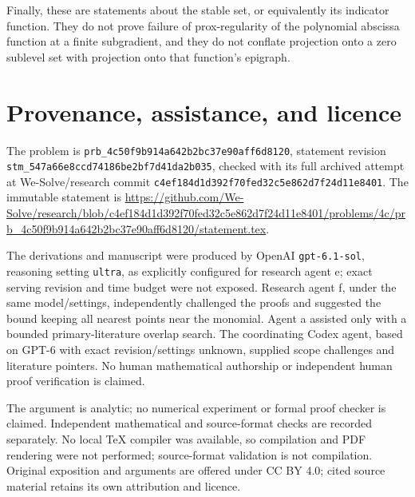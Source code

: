 \documentclass[11pt]{article}
\begin{document}
Finally, these are statements about the stable set, or equivalently its indicator function. They do not prove failure of prox-regularity of the polynomial abscissa function at a finite subgradient, and they do not conflate projection onto a zero sublevel set with projection onto that function's epigraph.

\section*{Provenance, assistance, and licence}

The problem is
\texttt{prb\_4c50f9b914a642b2bc37e90aff6d8120}, statement revision
\texttt{stm\_547a66e8ccd74186be2bf7d41da2b035}, checked with its full archived attempt at We-Solve/research commit
\texttt{c4ef184d1d392f70fed32c5e862d7f24d11e8401}.
The immutable statement is
\url{https://github.com/We-Solve/research/blob/c4ef184d1d392f70fed32c5e862d7f24d11e8401/problems/4c/prb_4c50f9b914a642b2bc37e90aff6d8120/statement.tex}.

The derivations and manuscript were produced by OpenAI
\texttt{gpt-6.1-sol}, reasoning setting \texttt{ultra}, as explicitly configured for research agent e; exact serving revision and time budget were not exposed. Research agent f, under the same model/settings, independently challenged the proofs and suggested the bound keeping all nearest points near the monomial. Agent a assisted only with a bounded primary-literature overlap search. The coordinating Codex agent, based on GPT-6 with exact revision/settings unknown, supplied scope challenges and literature pointers. No human mathematical authorship or independent human proof verification is claimed.

The argument is analytic; no numerical experiment or formal proof checker is claimed. Independent mathematical and source-format checks are recorded separately. No local TeX compiler was available, so compilation and PDF rendering were not performed; source-format validation is not compilation. Original exposition and arguments are offered under CC BY 4.0; cited source material retains its own attribution and licence.
\end{document}

